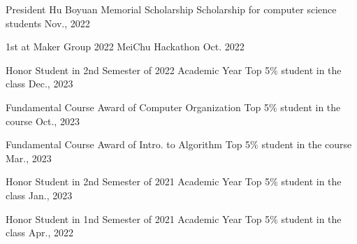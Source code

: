 



\begin{cvhonors}
%

\cvhonor
{President Hu Boyuan Memorial Scholarship} 
{Scholarship for computer science students} 
{} 
{Nov., 2022}


\cvhonor
{1st at Maker Group} 
{2022 MeiChu Hackathon} 
{} 
{Oct. 2022}


%

\end{cvhonors}




\begin{cvhonors}



\cvhonor
{Honor Student in 2nd Semester of 2022 Academic Year} 
{Top 5\% student in the class} 
{} 
{Dec., 2023}

\cvhonor
{Fundamental Course Award of Computer Organization}
{Top 5\% student in the course} 
{} 
{Oct., 2023}

\cvhonor
{Fundamental Course Award of Intro. to Algorithm} 
{Top 5\% student in the course} 
{} 
{Mar., 2023}


\cvhonor
{Honor Student in 2nd Semester of 2021 Academic Year} 
{Top 5\% student in the class} 
{} 
{Jan., 2023}



\cvhonor
{Honor Student in 1nd Semester of 2021 Academic Year} 
{Top 5\% student in the class} 
{} 
{Apr., 2022}

\end{cvhonors}